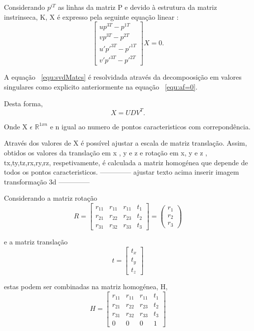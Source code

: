 	Considerando $p^{iT}$ as linhas da matriz P e devido à estrutura da matriz instrinseca, K, X é expresso pela seguinte equação linear :  \begin{equation}\label{equ:svdMatcs} 
	\left[ \begin{array}{cccc}
	up^{3T} - p^{1T} \\
	vp^{3T} - p^{2T} \\
	u'p'^{3T} - p'^{1T} \\
	v'p'^{3T} - p'^{2T} 
	\end{array} \right] X = 0 .
	\end{equation}
	
	A equação ~\ref{equ:svdMatcs} é resolvidada através da decompoosição em valores singulares como explicito anteriormente na equação ~\ref{equ:af=0}.
	
	Desta forma, \[ X = UDV^T. \] 
	
	Onde X $\epsilon$ $\mathbb{R}^{1xn}$ e n igual ao numero de pontos caracteristicos com correpondência.
	
	Através dos valores de X é possível ajustar a escala de matriz translação. Assim, obtidos os valores da translação em x , y e z e rotação em x, y e z , tx,ty,tz,rx,ry,rz, respetivamente, é calculada a matriz homogénea que depende de todos os pontos caracteristicos.
	--------------
	ajustar texto acima
	inserir imagem transformação 3d
	--------------
	
	Considerando a matriz rotação \[  R = \left[ \begin{array}{cccc}
	r_{11} & r_{11} & r_{11} & t_1 \\ 
	r_{21} & r_{22} & r_{23} & t_2 \\ 
	r_{31} & r_{32} & r_{33} & t_3 
	\end{array} \right] = \left(\begin{array}{ccc}
	r_1 \\ r_2 \\ r_3
	\end{array}\right)\]
	
	e a matriz translação \[ t = \left[ \begin{array}{ccc}
	t_x \\ t_y \\ t_z
	\end{array}\right]\]
	
	estas podem ser combinadas na matriz homogénea, H, \[ H = \left[ \begin{array}{cccc}
	r_{11} & r_{11} & r_{11} & t_1 \\ 
	r_{21} & r_{22} & r_{23} & t_2 \\ 
	r_{31} & r_{32} & r_{33} & t_3 \\ 
	0 & 0 & 0 & 1
	\end{array} \right] \] 
	
